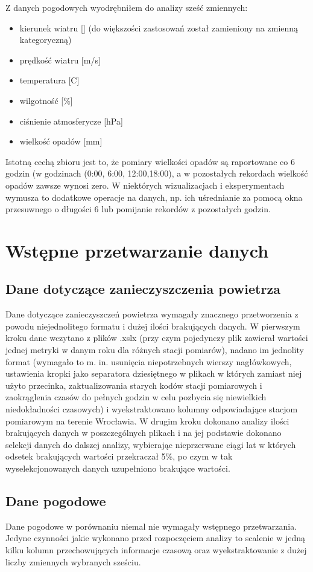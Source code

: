 \documentclass[18pt, letterpaper]{article}
\begin{document}
Z danych pogodowych wyodrębniłem do analizy sześć zmiennych: 
\begin{itemize}
\item kierunek wiatru [\degree] (do większości zastosowań został zamieniony na zmienną kategoryczną)
\item prędkość wiatru [m/s]
\item temperatura [\degree C]
\item wilgotność [\%]
\item ciśnienie atmosferycze [hPa]
\item wielkość opadów [mm]
\end{itemize}
Istotną cechą zbioru jest to, że pomiary wielkości opadów są raportowane co 6 godzin (w godzinach (0:00, 6:00, 12:00,18:00), a w pozostałych rekordach wielkość opadów zawsze wynosi zero. W niektórych wizualizacjach i eksperymentach wymusza to dodatkowe operacje na danych, np. ich uśrednianie za pomocą okna przesuwnego o długości 6 lub pomijanie rekordów z pozostałych godzin.



\section{Wstępne przetwarzanie danych}
\subsection{Dane dotyczące zanieczyszczenia powietrza}
Dane dotyczące zanieczyszczeń powietrza wymagały znacznego przetworzenia z powodu niejednolitego formatu i dużej ilości brakujących danych. W pierwszym kroku dane wczytano z plików .xslx (przy czym pojedynczy plik zawierał wartości jednej metryki w danym roku dla różnych stacji pomiarów), nadano im jednolity format (wymagało to m. in. usunięcia niepotrzebnych wierszy nagłówkowych, ustawienia kropki jako separatora dziesiętnego w plikach w których zamiast niej użyto przecinka, zaktualizowania starych kodów stacji pomiarowych i zaokrąglenia czasów do pełnych godzin w celu pozbycia się niewielkich niedokładności czasowych) i wyekstraktowano kolumny odpowiadające stacjom pomiarowym na terenie Wrocławia. W drugim kroku dokonano analizy ilości brakujących danych w poszczególnych plikach i na jej podstawie dokonano selekcji danych do dalszej analizy, wybierając nieprzerwane ciągi lat w których odsetek brakujących wartości przekraczał 5\%, po czym w tak wyselekcjonowanych danych uzupełniono brakujące wartości. 
\subsection{Dane pogodowe}
Dane pogodowe w porównaniu niemal nie wymagały wstępnego przetwarzania. Jedyne czynności jakie wykonano przed rozpoczęciem analizy to scalenie w jedną kilku kolumn przechowujących informacje czasową oraz wyekstraktowanie z dużej liczby zmiennych wybranych sześciu.
\end{document}
